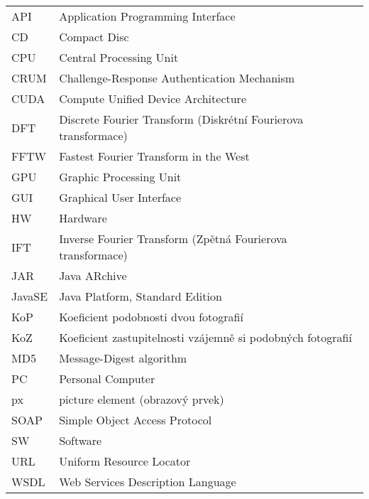 
\seznamzkr

\begin{tabular}{ll}
  API		& Application Programming Interface									\\
  CD		& Compact Disc														\\
  CPU		& Central Processing Unit											\\
  CRUM		& Challenge-Response Authentication Mechanism						\\
  CUDA		& Compute Unified Device Architecture								\\
  DFT		& Discrete Fourier Transform (Diskrétní Fourierova transformace)	\\
  FFTW		& Fastest Fourier Transform in the West 							\\
  GPU		& Graphic Processing Unit											\\
  GUI		& Graphical User Interface											\\
  HW		& Hardware															\\
  IFT		& Inverse Fourier Transform (Zpětná Fourierova transformace)		\\
  JAR		& Java ARchive														\\
  JavaSE	& Java Platform, Standard Edition									\\
  KoP		& Koeficient podobnosti dvou fotografií								\\
  KoZ		& Koeficient zastupitelnosti vzájemně si podobných fotografií		\\
  MD5		& Message-Digest algorithm											\\
  PC		& Personal Computer													\\
  px		& picture element (obrazový prvek)									\\
  SOAP		& Simple Object Access Protocol										\\
  SW		& Software															\\
  URL		& Uniform Resource Locator											\\
  WSDL		& Web Services Description Language									\\
\end{tabular}

